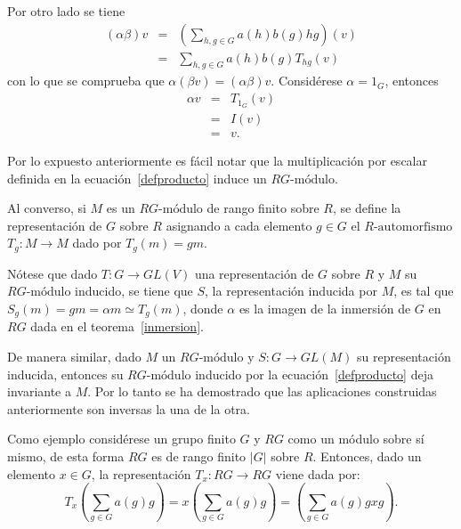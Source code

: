 \begin{proof*}
\begin{bulletList}
 Por otro lado se tiene
 \begin{eqnarray*}
 (\alpha\beta)v &=& \left( \sum_{h,g \in G}a(h)b(g)hg  \right)(v)\\
  &=& \sum_{h,g \in G}a(h)b(g)T_{hg}(v)
 \end{eqnarray*}
 con lo que se comprueba que $\alpha(\beta v) = (\alpha\beta)v$.
 \newItem Considérese $\alpha = 1_{G}$, entonces
 \begin{eqnarray*}
 \alpha v &=& T_{1_G}(v)\\
  &=& I(v) \\
  &=& v.
 \end{eqnarray*}
 \end{bulletList}
  Por lo expuesto anteriormente es fácil notar que la multiplicación por escalar definida en la ecuación~\eqref{defproducto} induce un $RG\mbox{-módulo}$.
 
 Al converso, si $M$ es un $RG\mbox{-módulo}$ de rango finito sobre $R$, se define la representación de $G$ sobre $R$ asignando a cada elemento $g \in G$ el $R\mbox{-automorfismo}$ $T_g \colon M \to M$ dado por $T_g(m) = gm$.
 
 Nótese que dado $T \colon G \to GL(V)$ una representación de $G$ sobre $R$ y $M$ su $RG\mbox{-módulo}$ inducido, se tiene que $S$, la representación inducida por $M$, es tal que $S_g(m) = gm = \alpha m \simeq T_g(m)$, donde $\alpha$ es la imagen de la inmersión de $G$ en $RG$ dada en el teorema~\ref{inmersion}.
 
 De manera similar, dado $M$ un $RG\mbox{-módulo}$ y $S \colon G \to GL(M)$ su representación inducida, entonces su $RG\mbox{-módulo}$ inducido por la ecuación~\eqref{defproducto} deja invariante a $M$. Por lo tanto se ha demostrado que las aplicaciones construidas anteriormente son inversas la una de la otra. 
 \end{proof*}
  Como ejemplo considérese  un grupo finito $G$ y $RG$ como un módulo sobre sí mismo, de esta forma $RG$ es de rango finito $|G|$ sobre $R$. Entonces, dado un elemento $x \in G$, la representación $T_x \colon RG \to RG$ viene dada por: \begin{equation*}T_{x}\left( \sum_{g \in G}a(g)g\right) = x\left( \sum_{g \in G}a(g)g\right) = \left( \sum_{g \in G}a(g)gxg\right).\end{equation*}
  
